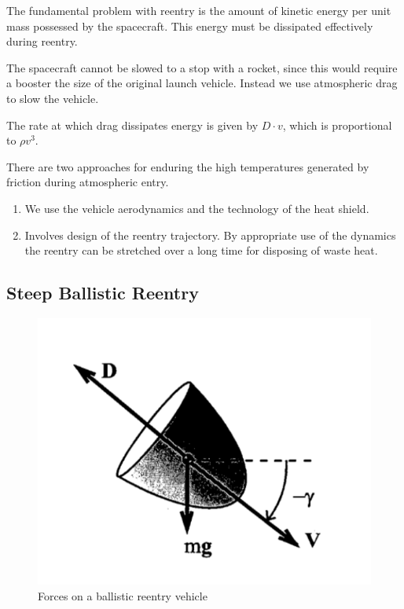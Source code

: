 \documentclass{article}
\theoremstyle{definition}
\begin{document}
The fundamental problem with reentry is the amount of kinetic energy per unit mass possessed by the spacecraft.
This energy must be dissipated effectively during reentry.

The spacecraft cannot be slowed to a stop with a rocket, since this would require a booster the size of the original launch vehicle. 
Instead we use atmospheric drag to slow the vehicle.

The rate at which drag dissipates energy is given by $D\cdot v$, which is proportional to $\rho v^3$. \medskip

There are two approaches for enduring the high temperatures generated by friction during atmospheric entry.
\begin{enumerate}
    \item We use the vehicle aerodynamics and the technology of the heat shield.
    \item Involves design of the reentry trajectory.
    By appropriate use of the dynamics the reentry can be stretched over a long time for disposing of waste heat.
\end{enumerate}

\subsection{Steep Ballistic Reentry}

\begin{figure}[h]
    \centering
    \includegraphics[scale=0.2]{image 19.png}
    \caption{Forces on a ballistic reentry vehicle}
    \label{fig:steep reentry}
\end{figure}
\end{document}

